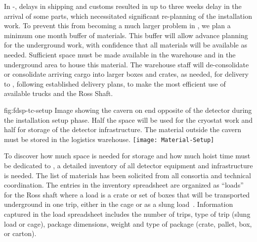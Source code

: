 In -, delays in shipping and customs resulted in up to three weeks delay in the arrival of some parts, which necessitated significant re-planning of the installation work. To prevent this from becoming a much larger problem in , we plan a minimum one month buffer of materials. This buffer will allow advance planning for the underground work, %
with confidence that all materials will be available as needed. %
Sufficient space must be made available in the warehouse and in the underground area  to house this material. %
The warehouse staff will de-consolidate or consolidate arriving cargo into larger boxes and crates, as needed, for  delivery to %
, following established %
delivery plans, to make the most efficient use of available trucks and the Ross Shaft. %


\begin{dunefigure}{fig:fdsp-tc-setup}
  {Image showing the cavern on end opposite of the detector during the installation setup phase.  Half the space will be used for the cryostat work and half for storage of the detector infrastructure. The material outside the cavern must be stored in the logistics warehouse.}
\texttt{[image: Material-Setup]}
\end{dunefigure}
%

To discover how much space is needed for storage and how much hoist time must be dedicated to , a detailed inventory of all detector equipment and  infrastructure is needed. The list of %
materials has been solicited from all consortia and technical coordination. The entries in the inventory spreadsheet are organized as ``loads'' for the Ross shaft where a load is a crate or set of boxes that will be transported underground in one trip, either in the %
cage or as a slung load~\cite{bib:docdb8426}. 
Information captured in the load spreadsheet includes the number of %
trips, type of trip (slung load or cage), package dimensions, weight and type of package (crate, pallet, box, or carton). 

